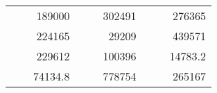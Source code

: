 \begin{table}[]
\begin{tabular}{|ccrccrccr}
\rowcolor[HTML]{DAE8FC} 
\multicolumn{1}{|c|}{\cellcolor[HTML]{FFFFC7}}                                & \multicolumn{1}{c|}{\cellcolor[HTML]{DAE8FC}}                      & \multicolumn{1}{r|}{\cellcolor[HTML]{DAE8FC}189000}    & \multicolumn{1}{c|}{\cellcolor[HTML]{FFFFC7}}                                & \multicolumn{1}{c|}{\cellcolor[HTML]{DAE8FC}}                       & \multicolumn{1}{r|}{\cellcolor[HTML]{DAE8FC}302491}    & \multicolumn{1}{c|}{\cellcolor[HTML]{FFFFC7}}                                & \multicolumn{1}{c|}{\cellcolor[HTML]{DAE8FC}}                      & \multicolumn{1}{r|}{\cellcolor[HTML]{DAE8FC}276365}    \\ \cline{3-3} \cline{6-6} \cline{9-9} 
\multicolumn{1}{|c|}{\cellcolor[HTML]{FFFFC7}}                                & \multicolumn{1}{c|}{\cellcolor[HTML]{DAE8FC}}                      & \multicolumn{1}{r|}{\cellcolor[HTML]{DDFDFF}224165}    & \multicolumn{1}{c|}{\cellcolor[HTML]{FFFFC7}}                                & \multicolumn{1}{c|}{\cellcolor[HTML]{DAE8FC}}                       & \multicolumn{1}{r|}{\cellcolor[HTML]{DDFDFF}29209}     & \multicolumn{1}{c|}{\cellcolor[HTML]{FFFFC7}}                                & \multicolumn{1}{c|}{\cellcolor[HTML]{DAE8FC}}                      & \multicolumn{1}{r|}{\cellcolor[HTML]{DDFDFF}439571}    \\ \cline{3-3} \cline{6-6} \cline{9-9} 
\rowcolor[HTML]{DAE8FC} 
\multicolumn{1}{|c|}{\cellcolor[HTML]{FFFFC7}}                                & \multicolumn{1}{c|}{\cellcolor[HTML]{DAE8FC}}                      & \multicolumn{1}{r|}{\cellcolor[HTML]{DAE8FC}229612}    & \multicolumn{1}{c|}{\cellcolor[HTML]{FFFFC7}}                                & \multicolumn{1}{c|}{\cellcolor[HTML]{DAE8FC}}                       & \multicolumn{1}{r|}{\cellcolor[HTML]{DAE8FC}100396}    & \multicolumn{1}{c|}{\cellcolor[HTML]{FFFFC7}}                                & \multicolumn{1}{c|}{\cellcolor[HTML]{DAE8FC}}                      & \multicolumn{1}{r|}{\cellcolor[HTML]{DAE8FC}14783.2}   \\ \cline{3-3} \cline{6-6} \cline{9-9} 
\multicolumn{1}{|c|}{\cellcolor[HTML]{FFFFC7}}                                & \multicolumn{1}{c|}{\cellcolor[HTML]{DAE8FC}}                      & \multicolumn{1}{r|}{\cellcolor[HTML]{DDFDFF}74134.8}   & \multicolumn{1}{c|}{\cellcolor[HTML]{FFFFC7}}                                & \multicolumn{1}{c|}{\cellcolor[HTML]{DAE8FC}}                       & \multicolumn{1}{r|}{\cellcolor[HTML]{DDFDFF}778754}    & \multicolumn{1}{c|}{\cellcolor[HTML]{FFFFC7}}                                & \multicolumn{1}{c|}{\cellcolor[HTML]{DAE8FC}}                      & \multicolumn{1}{r|}{\cellcolor[HTML]{DDFDFF}265167}    \\ \cline{3-3} \cline{6-6} \cline{9-9} 

\end{tabular}
\end{table}
